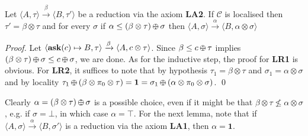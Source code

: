 \documentclass{llncs}
\def\1{{\mathbf 1}}
\def\C{{\mathcal C}}
\newcommand{\ask}{{\bf ask}}
\def\monid{{\mathbf 0}}
\def\1{{\mathbf 1}}
\def\C{{\mathcal C}}
\def\odiv{\, {\ominus\hspace{-7.7pt} \div} \,}
\def\monid{\mathbf{1}}
\begin{document}
\begin{lemma}
\label{LA2}
Let $\langle A, \tau \rangle \xrightarrow{\beta} \langle B, \tau' \rangle$ be a reduction 
via the axiom {\bf LA2}. If $\C$ is localised then $\tau' = \beta \otimes \tau$
and for every $\sigma$ if $\alpha \leq (\beta \otimes \tau) \odiv \sigma$ then
$\langle A, \sigma \rangle \xrightarrow{\alpha} \langle B, \alpha \otimes \sigma \rangle$
%
\end{lemma}
\begin{proof}
Let $\langle \hbox{\ask}(c) \mapsto B, \tau \rangle \xrightarrow{\beta} \langle A, c \otimes \tau \rangle$.
Since $\beta \leq c \odiv \tau$ implies 
$(\beta \otimes \tau)\odiv \sigma \leq c \odiv \sigma$,
we are done.
As for the inductive step, the proof for 
{\bf LR1} is obvious. For {\bf LR2},
it suffices to note that by hypothesis 
$\tau_1 = \beta \otimes \tau$ and $\sigma_1 = \alpha \otimes \sigma$
and by locality 
$\tau_1 \odiv (\beta \otimes \pi_0 \otimes \tau) = \monid = \sigma_1 \odiv (\alpha \otimes \pi_0 \otimes \sigma)$.
\qed
\end{proof}

Clearly $\alpha = (\beta \otimes \tau) \odiv \sigma$ is a possible choice, even if 
it might be that $\beta \otimes \tau \not \leq \alpha \otimes \sigma$,
e.g. if $\sigma = \bot$, in which case $\alpha = \top$.
%
For the next lemma, note that if 
$\langle A, \sigma \rangle \xrightarrow{\alpha} \langle B, \sigma' \rangle$ is a reduction 
via the axiom {\bf LA1}, then $\alpha = \1$.
\end{document}
